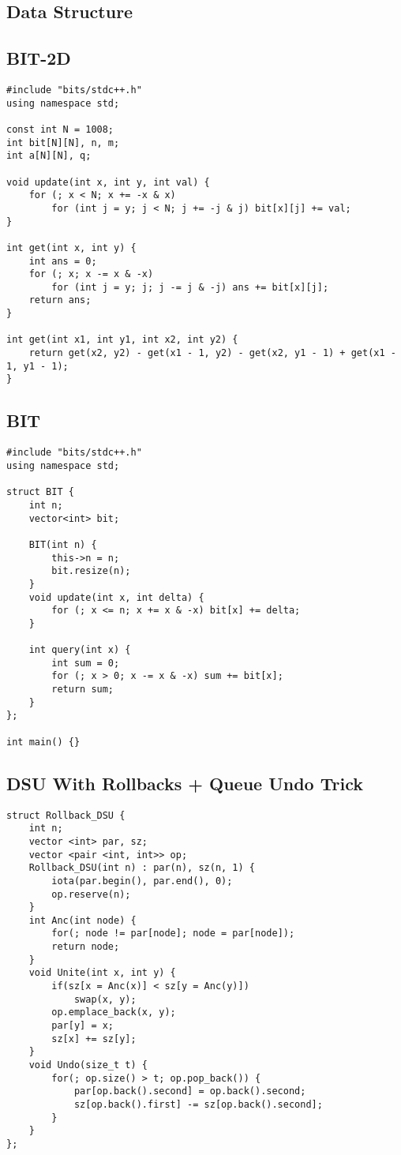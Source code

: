 \documentclass[FSZ,a4paper,onesided]{article}
\begin{document}
\begin{multicols*}{\COLS}
\section{Data Structure}
\subsection{BIT-2D}
\begin{lstlisting}
#include "bits/stdc++.h"
using namespace std;
 
const int N = 1008;
int bit[N][N], n, m;
int a[N][N], q;
 
void update(int x, int y, int val) {
    for (; x < N; x += -x & x)
        for (int j = y; j < N; j += -j & j) bit[x][j] += val;
}
 
int get(int x, int y) {
    int ans = 0;
    for (; x; x -= x & -x)
        for (int j = y; j; j -= j & -j) ans += bit[x][j];
    return ans;
}
 
int get(int x1, int y1, int x2, int y2) {
    return get(x2, y2) - get(x1 - 1, y2) - get(x2, y1 - 1) + get(x1 - 1, y1 - 1);
}
\end{lstlisting}
\subsection{BIT}
\begin{lstlisting}
#include "bits/stdc++.h"
using namespace std;

struct BIT {
    int n;
    vector<int> bit; 

    BIT(int n) {
        this->n = n;
        bit.resize(n);
    }
    void update(int x, int delta) {
        for (; x <= n; x += x & -x) bit[x] += delta;
    }

    int query(int x) {
        int sum = 0;
        for (; x > 0; x -= x & -x) sum += bit[x];
        return sum;
    }
};

int main() {}
\end{lstlisting}
\subsection{DSU With Rollbacks + Queue Undo Trick}
\begin{lstlisting}
struct Rollback_DSU {
    int n;
    vector <int> par, sz;
    vector <pair <int, int>> op;
    Rollback_DSU(int n) : par(n), sz(n, 1) {
        iota(par.begin(), par.end(), 0);
        op.reserve(n);
    }
    int Anc(int node) {
        for(; node != par[node]; node = par[node]);
        return node;
    }
    void Unite(int x, int y) {
        if(sz[x = Anc(x)] < sz[y = Anc(y)])
            swap(x, y);
        op.emplace_back(x, y);
        par[y] = x;
        sz[x] += sz[y];
    }
    void Undo(size_t t) {
        for(; op.size() > t; op.pop_back()) {
            par[op.back().second] = op.back().second;
            sz[op.back().first] -= sz[op.back().second];
        }
    }
};\end{lstlisting}

\end{multicols*}
\end{document}
